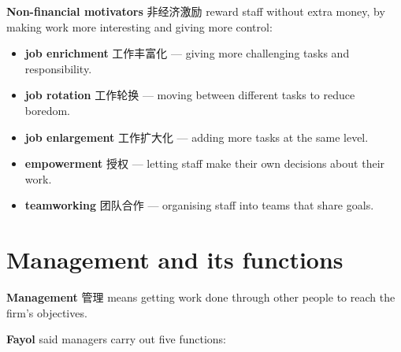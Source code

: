 \documentclass[11pt]{article}
\begin{document}
\textbf{Non-financial motivators} 非经济激励 reward staff without extra money, by making work more interesting and giving more control:

\begin{itemize}
\item \textbf{job enrichment} 工作丰富化 — giving more challenging tasks and responsibility.

\item \textbf{job rotation} 工作轮换 — moving between different tasks to reduce boredom.

\item \textbf{job enlargement} 工作扩大化 — adding more tasks at the same level.

\item \textbf{empowerment} 授权 — letting staff make their own decisions about their work.

\item \textbf{teamworking} 团队合作 — organising staff into teams that share goals.

\end{itemize}

\section*{Management and its functions}

\textbf{Management} 管理 means getting work done through other people to reach the firm's objectives.

\textbf{Fayol} said managers carry out five functions:

\begin{center}
\end{center}
\end{document}
